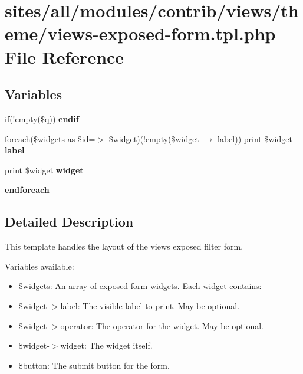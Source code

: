 \hypertarget{views-exposed-form_8tpl_8php}{
\section{sites/all/modules/contrib/views/theme/views-exposed-form.tpl.php File Reference}
\label{views-exposed-form_8tpl_8php}
}
\subsection*{Variables}
\begin{CompactItemize}
\item 
\hypertarget{views-exposed-form_8tpl_8php_aead554b47be786953823c480043cc0a}{
if(!empty(\$q)) \textbf{endif}}
\label{views-exposed-form_8tpl_8php_aead554b47be786953823c480043cc0a}

\item 
\hypertarget{views-exposed-form_8tpl_8php_9916a5a9d648601cff49e29f6af31a61}{
foreach(\$widgets as \$id=$>$ \$widget)(!empty(\$widget $\rightarrow$ label)) print \$widget \textbf{label}}
\label{views-exposed-form_8tpl_8php_9916a5a9d648601cff49e29f6af31a61}

\item 
\hypertarget{views-exposed-form_8tpl_8php_36d328c3630d51e9dcdf8d9532b8b14c}{
print \$widget \textbf{widget}}
\label{views-exposed-form_8tpl_8php_36d328c3630d51e9dcdf8d9532b8b14c}

\item 
\hypertarget{views-exposed-form_8tpl_8php_672d9707ef91db026c210f98cc601123}{
\textbf{endforeach}}
\label{views-exposed-form_8tpl_8php_672d9707ef91db026c210f98cc601123}

\end{CompactItemize}


\subsection{Detailed Description}
This template handles the layout of the views exposed filter form.

Variables available:\begin{itemize}
\item \$widgets: An array of exposed form widgets. Each widget contains:\item \$widget-$>$label: The visible label to print. May be optional.\item \$widget-$>$operator: The operator for the widget. May be optional.\item \$widget-$>$widget: The widget itself.\item \$button: The submit button for the form. \end{itemize}

